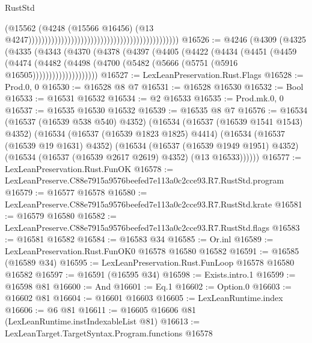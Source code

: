 \begin{lexlean}{RustStd}
\begin{coremodule}
                                                                                          (@15562
                                                                                            (@4248
                                                                                              (@15566
                                                                                                @16456)
                                                                                              (@13
                                                                                                @4247))))))))))))))))))))))))))))))))))))))))))))))
@16526 := @4246
    (@4309
      (@4325
        (@4335
          (@4343
            (@4370
              (@4378
                (@4397
                  (@4405
                    (@4422
                      (@4434
                        (@4451
                          (@4459
                            (@4474
                              (@4482
                                (@4498 (@4700 (@5482 (@5666 (@5751 (@5916 @16505))))))))))))))))))))
@16527 := LexLeanPreservation.Rust.Flags
@16528 := Prod.{0, 0}
@16530 := @16528 @8 @7
@16531 := @16528 @16530
@16532 := Bool
@16533 := @16531 @16532
@16534 := @2 @16533
@16535 := Prod.mk.{0, 0}
@16537 := @16535 @16530 @16532
@16539 := @16535 @8 @7
@16576 := @16534
    (@16537 (@16539 @538 @540) @4352)
    (@16534
      (@16537 (@16539 @1541 @1543) @4352)
      (@16534
        (@16537 (@16539 @1823 @1825) @4414)
        (@16534
          (@16537 (@16539 @19 @1631) @4352)
          (@16534
            (@16537 (@16539 @1949 @1951) @4352)
            (@16534 (@16537 (@16539 @2617 @2619) @4352) (@13 @16533))))))
@16577 := LexLeanPreservation.Rust.FunOK
@16578 := LexLeanPreserve.C88e7915a9576beefed7e113a0c2cce93.R7.RustStd.program
@16579 := @16577 @16578
@16580 := LexLeanPreserve.C88e7915a9576beefed7e113a0c2cce93.R7.RustStd.krate
@16581 := @16579 @16580
@16582 := LexLeanPreserve.C88e7915a9576beefed7e113a0c2cce93.R7.RustStd.flags
@16583 := @16581 @16582
@16584 := @16583 @34
@16585 := Or.inl
@16589 := LexLeanPreservation.Rust.FunOK0 @16578 @16580 @16582
@16591 := @16585 (@16589 @34)
@16595 := LexLeanPreservation.Rust.FunLoop @16578 @16580 @16582
@16597 := @16591 (@16595 @34)
@16598 := Exists.intro.{1}
@16599 := @16598 @81
@16600 := And
@16601 := Eq.{1}
@16602 := Option.{0}
@16603 := @16602 @81
@16604 := @16601 @16603
@16605 := LexLeanRuntime.index
@16606 := @6 @81
@16611 := @16605 @16606 @81 (LexLeanRuntime.instIndexableList @81)
@16613 := LexLeanTarget.TargetSyntax.Program.functions @16578

\end{coremodule}
\end{lexlean}
